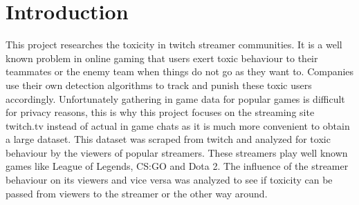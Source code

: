 \documentclass[final]{report}
\begin{document}
\chapter{Introduction}
\label{ch:introduction}

This project researches the toxicity in twitch streamer communities.
It is a well known problem in online gaming that users exert toxic behaviour to their teammates or the enemy team when things do not go as they want to.
Companies use their own detection algorithms to track and punish these toxic users accordingly.
Unfortunately gathering in game data for popular games is difficult for privacy reasons, this is why this project focuses on the streaming site twitch.tv instead of actual in game chats as it is much more convenient to obtain a large dataset.
This dataset was scraped from twitch and analyzed for toxic behaviour by the viewers of popular streamers.
These streamers play well known games like League of Legends, CS:GO and Dota 2.
The influence of the streamer behaviour on its viewers and vice versa was analyzed to see if toxicity can be passed from viewers to the streamer or the other way around.
\end{document}
